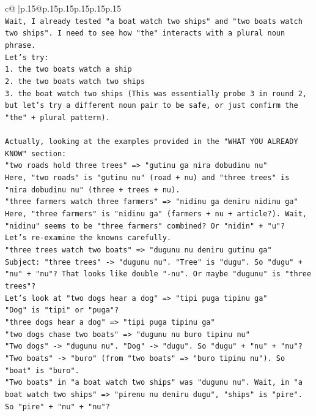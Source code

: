 \documentclass{article}
\begin{document}
{\begin{supertabular}{c@{$\;$}|p{.15\linewidth}@{}p{.15\linewidth}p{.15\linewidth}p{.15\linewidth}p{.15\linewidth}p{.15\linewidth}}
{{{\\ 
\texttt{Wait, I already tested "a boat watch two ships" and "two boats watch two ships". I need to see how "the" interacts with a plural noun phrase.} \\
\texttt{Let's try:} \\
\texttt{1. the two boats watch a ship} \\
\texttt{2. the two boats watch two ships} \\
\texttt{3. the boat watch two ships (This was essentially probe 3 in round 2, but let's try a different noun pair to be safe, or just confirm the "the" + plural pattern).} \\
\\ 
\texttt{Actually, looking at the examples provided in the "WHAT YOU ALREADY KNOW" section:} \\
\texttt{"two roads hold three trees" => "gutinu ga nira dobudinu nu"} \\
\texttt{Here, "two roads" is "gutinu nu" (road + nu) and "three trees" is "nira dobudinu nu" (three + trees + nu).} \\
\texttt{"three farmers watch three farmers" => "nidinu ga deniru nidinu ga"} \\
\texttt{Here, "three farmers" is "nidinu ga" (farmers + nu + article?). Wait, "nidinu" seems to be "three farmers" combined? Or "nidin" + "u"?} \\
\texttt{Let's re{-}examine the knowns carefully.} \\
\texttt{"three trees watch two boats" => "dugunu nu deniru gutinu ga"} \\
\texttt{Subject: "three trees" {-}> "dugunu nu". "Tree" is "dugu". So "dugu" + "nu" + "nu"? That looks like double "{-}nu". Or maybe "dugunu" is "three trees"?} \\
\texttt{Let's look at "two dogs hear a dog" => "tipi puga tipinu ga"} \\
\texttt{"Dog" is "tipi" or "puga"?} \\
\texttt{"three dogs hear a dog" => "tipi puga tipinu ga"} \\
\texttt{"two dogs chase two boats" => "dugunu nu buro tipinu nu"} \\
\texttt{"Two dogs" {-}> "dugunu nu". "Dog" {-}> "dugu". So "dugu" + "nu" + "nu"?} \\
\texttt{"Two boats" {-}> "buro" (from "two boats" => "buro tipinu nu"). So "boat" is "buro".} \\
\texttt{"Two boats" in "a boat watch two ships" was "dugunu nu". Wait, in "a boat watch two ships" => "pirenu nu deniru dugu", "ships" is "pire". So "pire" + "nu" + "nu"?} \\
}}}
\end{supertabular}}
\end{document}
